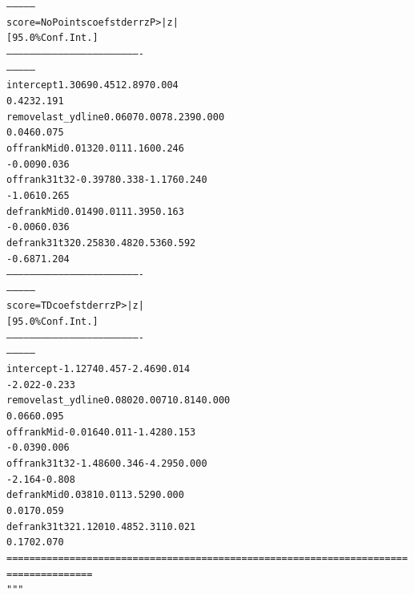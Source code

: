 \documentclass[letterpaper,10pt,english]{/anaconda/lib/python2.7/site-packages/sphinx/texinputs/sphinxhowto}
\newenvironment{InvisibleVerbatim}
        {\begin{mdframed}[leftmargin=0.1\linewidth,innerleftmargin=3pt,innerrightmargin=3pt, userdefinedwidth=1\linewidth, linewidth=0pt, linecolor=white, usetwoside=false]}
        {\end{mdframed}}
\begin{document}
\begin{InvisibleVerbatim}
\begin{alltt}
---------------
   score=NoPoints       coef    std err          z      P>|z|
[95.0\% Conf. Int.]
----------------------------------------------------------------------
---------------
intercept             1.3069      0.451      2.897      0.004
0.423     2.191
removelast\_ydline     0.0607      0.007      8.239      0.000
0.046     0.075
offrankMid            0.0132      0.011      1.160      0.246
-0.009     0.036
offrank31t32         -0.3978      0.338     -1.176      0.240
-1.061     0.265
defrankMid            0.0149      0.011      1.395      0.163
-0.006     0.036
defrank31t32          0.2583      0.482      0.536      0.592
-0.687     1.204
----------------------------------------------------------------------
---------------
         score=TD       coef    std err          z      P>|z|
[95.0\% Conf. Int.]
----------------------------------------------------------------------
---------------
intercept            -1.1274      0.457     -2.469      0.014
-2.022    -0.233
removelast\_ydline     0.0802      0.007     10.814      0.000
0.066     0.095
offrankMid           -0.0164      0.011     -1.428      0.153
-0.039     0.006
offrank31t32         -1.4860      0.346     -4.295      0.000
-2.164    -0.808
defrankMid            0.0381      0.011      3.529      0.000
0.017     0.059
defrank31t32          1.1201      0.485      2.311      0.021
0.170     2.070
======================================================================
===============
"""\end{alltt}

            \end{InvisibleVerbatim}
            
        
    


    

        
        

            
\end{document}
